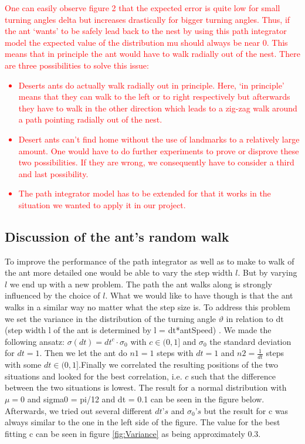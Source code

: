 \documentclass[11pt]{article}
\begin{document}
\textcolor{red}{
One can easily observe figure 2 that the expected error is quite low for small turning angles delta but increases drastically for bigger turning angles. Thus, if the ant ‘wants’ to be safely lead back to the nest by using this path integrator model the expected value of the distribution mu should always be near 0. This means that in principle the ant would have to walk radially out of the nest. There are three possibilities to solve this issue:
\begin{itemize}
\item Deserts ants do actually walk radially out in principle. Here, ‘in principle’ means that they can walk to the left or to right respectively but afterwards they have to walk in the other direction which leads to a zig-zag walk around a path pointing radially out of the nest. 
\item Desert ants can’t find home without the use of landmarks to a relatively large amount.
One would have to do further experiments to prove or disprove these two possibilities. If they are wrong, we consequently have to consider a third and last possibility.
\item The path integrator model has to be extended for that it works in the situation we wanted to apply it in our project.
\end{itemize}
}
\subsection{Discussion of the ant's random walk}
To improve the performance of the path integrator as well as to make to walk of the ant more detailed one would be able to vary the step width $l$. 
But by varying $l$ we end up with a new problem. The path the ant walks along is strongly influenced by the choice of $l$. What we would like to have though is that the ant walks in a similar way no matter what the step size is. 
To address this problem we set the variance in the distribution of the turning angle $\vartheta$ in relation to dt (step width l of the ant is determined by l = dt*antSpeed) . 
We made the following ansatz: $\sigma(dt) = dt^{c} \cdot \sigma_{0}$ with $c \in (0,1]$ and $\sigma_{0}$ the standard deviation for $dt = 1$.
Then we let the ant do $n1=1$ steps with $dt=1$ and $n2=\frac{1}{dt}$ steps with some $dt \in (0,1]$.Finally we correlated the resulting positions of the two situations and looked for the best correlation, i.e. $c$ such that the difference between the two situations is lowest. 
The result for a normal distribution with $\mu = 0$ and sigma0 = pi/12 and dt = 0.1 can be seen in the figure below.
Afterwards, we tried out several different $dt’s$ and $\sigma_{0}’s$ but the result for c was always similar to the one in the left side of the figure. The value for the best fitting c can be seen in figure \ref{fig:Variance} as being approximately 0.3.  
\end{document}
